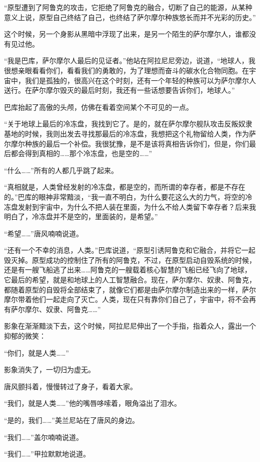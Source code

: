 “原型遭到了阿鲁克的攻击，它拒绝了阿鲁克的融合，切断了自己的能源，从某种意义上说，原型自己终结了自己，也终结了萨尔摩尔种族悠长而并不光彩的历史。” 

这个时候，另一个身影从黑暗中浮现了出来，是另一个陌生的萨尔摩尔人，谁都没有见过他。 

“我是巴库，萨尔摩尔人最后的见证者。”他站在阿拉尼尼旁边，说道，“地球人，我很想亲眼看看你们，看看我们的勇敢的，为了理想而奋斗的碳水化合物同胞。在宇宙中，我们是孤独的，很高兴在这个时刻，还有一个年轻的种族可以为萨尔摩尔人送行。在萨尔摩尔毁灭的最后时刻，我还有一些话想要告诉你们，地球人。” 

巴库抬起了高傲的头颅，仿佛在看着空间某个不可见的一点。 

“关于地球上最后的冷冻盘，我找到它了。是的，就在萨尔摩尔舰队攻击反叛奴隶基地的时候，我则出发去寻找那最后的冷冻盘，我想把这个礼物留给人类，作为萨尔摩尔种族的最后一个补偿。我很犹豫，是不是该将真相告诉你们，但是，你们最后都会得到真相的……那个冷冻盘，也是空的……” 

“什么……”所有的人都几乎跳了起来。 

“真相就是，人类曾经发射的冷冻盘，都是空的，而所谓的幸存者，都是不存在的。”巴库的眼神非常黯淡，“我一直不明白，为什么要花这么大的力气，将空的冷冻盘发射到宇宙中，为什么不把人装在里面，为什么不给人类留下幸存者？后来我明白了，冷冻盘并不是空的，里面装的，是希望。” 

“希望……”唐风喃喃说道。 

“还有一个不幸的消息，人类。”巴库说道，“原型引诱阿鲁克和它融合，并将它一起毁灭掉。原型成功的控制住了所有的阿鲁克，不过，在原型启动自毁系统的时候，还是有一艘飞船逃了出来……阿鲁克的一艘载着核心智慧的飞船已经飞向了地球，它最后的希望，就是和地球上的人工智慧融合。现在，萨尔摩尔、奴隶、阿鲁克，都随着原型的自毁将全部结束了，就像它们都是由萨尔摩尔制造出来的一样，萨尔摩尔带着他们一起走向了灭亡。人类，现在只有靠你们自己了，宇宙中，将不会再有萨尔摩尔、奴隶、阿鲁克……” 

影象在渐渐黯淡下去，这个时候，阿拉尼尼伸出了一个手指，指着众人，露出一个抑郁的微笑： 

“你们，就是人类……” 

影象消失了，一切归为虚无。 

唐风颤抖着，慢慢转过了身子，看着大家。 

“我们，就是人类……”他的嘴唇哆嗦着，眼角溢出了泪水。 

“是的，我们……”美兰尼站在了唐风的身边。 

“我们……”盖尔喃喃说道。 

“我们……”甲拉默默地说道。 

